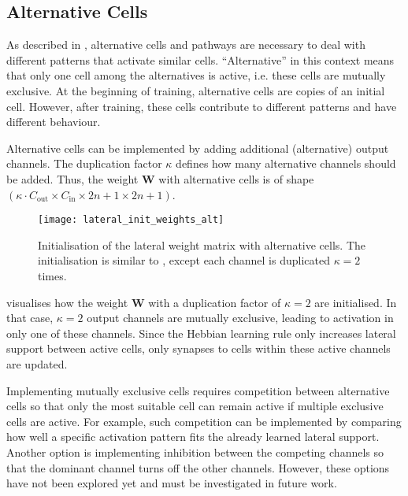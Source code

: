 \subsection{Alternative Cells}
As described in , alternative cells and pathways are necessary to deal with different patterns that activate similar cells.
``Alternative'' in this context means that only one cell among the alternatives is active, i.e. these cells are mutually exclusive.
At the beginning of training, alternative cells are copies of an initial cell.
However, after training, these cells contribute to different patterns and have different behaviour.

Alternative cells can be implemented by adding additional (alternative) output channels.
The duplication factor $\kappa$ defines how many alternative channels should be added.
Thus, the weight $\boldsymbol{W}$ with alternative cells is of shape $(\kappa \cdot C_{\text{out}} \times C_{\text{in}} \times 2n+1 \times 2n+1)$.

\begin{figure}[h]
    \centering
    \texttt{[image: lateral\_init\_weights\_alt]}
    \caption[Initialisation of the lateral weight matrix with alternative cells]{Initialisation of the lateral weight matrix with alternative cells. The initialisation is similar to , except each channel is duplicated $\kappa=2$ times.}
\end{figure}

 visualises how the weight $\boldsymbol{W}$ with a duplication factor of $\kappa=2$ are initialised.
In that case, $\kappa=2$ output channels are mutually exclusive, leading to activation in only one of these channels.
Since the Hebbian learning rule only increases lateral support between active cells, only synapses to cells within these active channels are updated.

Implementing mutually exclusive cells requires competition between alternative cells so that only the most suitable cell can remain active if multiple exclusive cells are active.
For example, such competition can be implemented by comparing how well a specific activation pattern fits the already learned lateral support.
Another option is implementing inhibition between the competing channels so that the dominant channel turns off the other channels.
However, these options have not been explored yet and must be investigated in future work.


